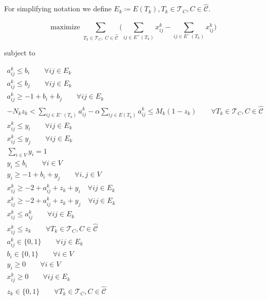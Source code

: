 For simplifying notation we define $E_{k} \coloneqq E(T_{k}), T_{k} \in
	\mathcal{T}_{C}, C \in \mathcal{\hat{C}}$.

\begin{equation}
	\label{eq:d-ecp-objective}
	\text{maximize} \; \sum_{ T_{k} \in \mathcal{T}_{C}, \; C \in
		\mathcal{\hat{C}} } \big( \sum^{}_{ij \in E^{+} (T_{k})} x_{ij}
		^{k} - \sum_{ij \in E^{-} (T_{k})} x_{ij} ^{k} \big)
\end{equation} \begin{center} subject to \end{center}
\begin{gather}
	\label{eq:d-ecp-a-ij-l-bi}
	a_{ij}^{k} \leq b_{i} \quad\quad \forall ij \in E_k \\
	\label{eq:d-ecp-a-ij-l-bj}
	a_{ij}^{k} \leq b_{j} \quad\quad \forall ij \in E_k \\
	\label{eq:d-ecp-a-ij-g-ijk}
	a _{ij} ^{k} \geq - 1 + b_i + b_j \quad\quad \forall ij \in E_k \\
	\label{eq:d-ecp-alpha-constraint}
	-N_{k} z_k < \sum^{}_{ij \in E^{-} (T_k)} a_{ij}^{k}  - \alpha \sum^{}_{ij \in E(T_k)}
	a_{ij} ^{k}  \leq M_k (1 - z_k) \quad\quad \forall T_{k} \in \mathcal{T} _{C}, C \in
	\hat{\mathcal{C}} \\
	\label{eq:d-ecp-edge-charikar1}
	x _{ij}^{k}  \leq y_i \quad\quad \forall ij \in E_{k} \\
	\label{eq:d-ecp-edge-charikar2}
	x _{ij} ^{k} \leq y_j \quad\quad \forall ij \in E_k \\
	\label{eq:d-ecp-vertex-charikar1}
	\sum^{}_{i \in V} y_i = 1 \\
	\label{eq:d-ecp-vertex-l-b}
	y_i \leq b_i \quad\quad \forall i \in V \\
	\label{eq:d-ecp-vertex-g-bi-yj}
	y_i \geq -1 + b_i + y_j \quad\quad \forall i,j \in V \\
	\label{eq:d-ecp-x-l-sum1}
	x_{ij}^{k} \geq -2 + a_{ij} ^{k} + z_k + y_i \quad \forall ij \in E_k \\
	\label{eq:d-ecp-x-l-sum2}
	x_{ij}^{k} \geq -2 + a_{ij} ^{k} + z_k + y_j \quad \forall ij \in E_k \\
	\label{eq:d-ecp-x-l-a}
	x_{ij} ^{k} \leq a_{ij} ^{k} \quad\quad \forall ij \in E_k \\
	\label{eq:d-ecp-x-l-z}
	x_{ij} ^{k} \leq z_k \quad\quad \forall T_{k} \in \mathcal{T} _{C}, C \in
	\hat{\mathcal{C}}  \\
	\label{eq:d-ecp-a-ij}
	a _{ij} ^{k}  \in \{0, 1\} \quad\quad \forall ij \in E_k\\
	\label{eq:d-ecp-b-i}
	b _{i} \in \{0, 1\} \quad\quad \forall i \in V \\
	\label{eq:d-ecp-y-i}
	y _{i} \geq 0 \quad\quad \forall i \in V \\
	\label{eq:d-ecp-x-ij}
	x _{ij} ^{k}  \geq 0 \quad\quad \forall ij \in E_k\\
	\label{eq:d-ecp-z-k}
	z _{k} \in \{0, 1\} \quad\quad \forall T_{k} \in \mathcal{T} _{C}, C \in
	\hat{\mathcal{C}}
\end{gather}

